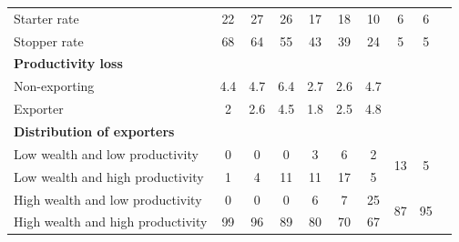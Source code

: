 \begin{table}[!ht]
{\begin{tabular}{l ccc | ccc | ccc}
Starter rate & 22 & 27 & 26 & 17 & 18 & 10 & 6 & 6 \\
Stopper rate & 68 & 64 & 55 & 43 & 39 & 24 & 5 & 5 \\
\textbf{Productivity loss} & & & & & & & & & \\
 Non-exporting & 4.4 & 4.7 & 6.4 & 2.7 & 2.6 & 4.7 \\
 Exporter & 2 & 2.6 & 4.5 & 1.8 & 2.5 & 4.8 \\
\textbf{Distribution of exporters} & & & & & & & & & \\
 Low wealth and low productivity & 0 & 0 & 0 & 3 & 6 & 2 & \multirow{2}{*}{13} & \multirow{2}{*}{5} \\
Low wealth and high productivity & 1 & 4 & 11 & 11 & 17 & 5 \\
High wealth and low productivity & 0 & 0 & 0 & 6 & 7 & 25 & \multirow{2}{*}{87} & \multirow{2}{*}{95} \\
High wealth and high productivity & 99 & 96 & 89 & 80 & 70 & 67 \\
\hline
\hline
\end{tabular}
}
\end{table}
